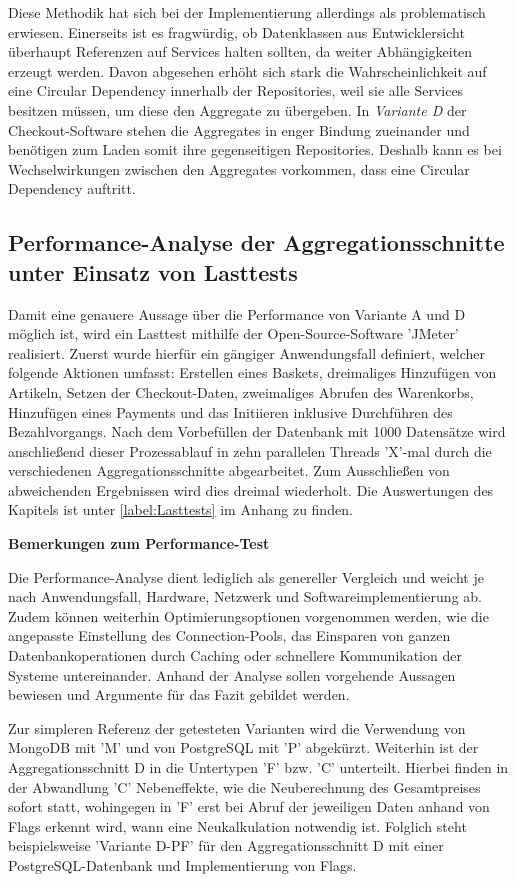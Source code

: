 Diese Methodik hat sich bei der Implementierung allerdings als problematisch erwiesen. Einerseits ist es fragwürdig, ob Datenklassen aus Entwicklersicht überhaupt Referenzen auf Services halten sollten, da weiter Abhängigkeiten erzeugt werden. Davon abgesehen erhöht sich stark die Wahrscheinlichkeit auf eine Circular Dependency innerhalb der Repositories, weil sie alle Services besitzen müssen, um diese den Aggregate zu übergeben. In \emph{Variante D} der Checkout-Software stehen die Aggregates in enger Bindung zueinander und benötigen zum Laden somit ihre gegenseitigen Repositories. Deshalb kann es bei Wechselwirkungen zwischen den Aggregates vorkommen, dass eine Circular Dependency auftritt.

\subsection{Performance-Analyse der Aggregationsschnitte unter Einsatz von Lasttests}

Damit eine genauere Aussage über die Performance von Variante A und D möglich ist, wird ein Lasttest mithilfe der Open-Source-Software 'JMeter' realisiert. Zuerst wurde hierfür ein gängiger Anwendungsfall definiert, welcher folgende Aktionen umfasst: Erstellen eines Baskets, dreimaliges Hinzufügen von Artikeln, Setzen der Checkout-Daten, zweimaliges Abrufen des Warenkorbs, Hinzufügen eines Payments und das Initiieren inklusive Durchführen des Bezahlvorgangs. Nach dem Vorbefüllen der Datenbank mit 1000 Datensätze wird anschließend dieser Prozessablauf in zehn parallelen Threads 'X'-mal durch die verschiedenen Aggregationsschnitte abgearbeitet. Zum Ausschließen von abweichenden Ergebnissen wird dies dreimal wiederholt. Die Auswertungen des Kapitels ist unter \ref{label:Lasttests} im Anhang zu finden.

\textbf{Bemerkungen zum Performance-Test}

Die Performance-Analyse dient lediglich als genereller Vergleich und weicht je nach Anwendungsfall, Hardware, Netzwerk und Softwareimplementierung ab. Zudem können weiterhin Optimierungsoptionen vorgenommen werden, wie die angepasste Einstellung des \Gls{Connection-Pool}s, das Einsparen von ganzen Datenbankoperationen durch Caching oder schnellere Kommunikation der Systeme untereinander. Anhand der Analyse sollen vorgehende Aussagen bewiesen und Argumente für das Fazit gebildet werden.

Zur simpleren Referenz der getesteten Varianten wird die Verwendung von MongoDB mit 'M' und von PostgreSQL mit 'P' abgekürzt. Weiterhin ist der Aggregationsschnitt D in die Untertypen 'F' bzw. 'C' unterteilt. Hierbei finden in der Abwandlung 'C' Nebeneffekte, wie die Neuberechnung des Gesamtpreises sofort statt, wohingegen in 'F' erst bei Abruf der jeweiligen Daten anhand von Flags erkennt wird, wann eine Neukalkulation notwendig ist. Folglich steht beispielsweise 'Variante D-PF' für den Aggregationsschnitt D mit einer PostgreSQL-Datenbank und Implementierung von Flags.

